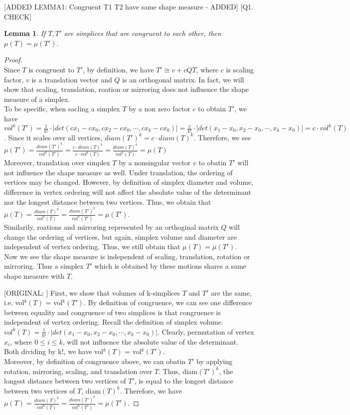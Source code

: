 \documentclass{article}
\newtheorem*{lemma*}{Lemma}
\begin{document}
    [ADDED LEMMA1: Congruent T1 T2 have same shape measure - ADDED]
    [Q1. CHECK]
    \begin{lemma*}
    If $T, T'$ are simplices that are congruent to each other, then $\mu(T) = \mu(T')$.
    \end{lemma*}
    \begin{proof}\mbox{}\\
    Since $T$ is congruent to $T'$, by definition, we have $T' \cong v + cQT$, where $c$ is scaling factor, $v$ is a translation vector and $Q$ is an orthogonal matrix. In fact, we will show that scaling, translation, roation or mirroring does not influence the shape measure of a simplex. \\
    To be specific, when sacling a simplex $T$ by a non zero factor $c$ to obtain $T'$, we have \(vol^k(T') = \displaystyle \frac{1}{k!}\cdot|det(cx_1-cx_0, cx_2-cx_0,\cdots, cx_k-cx_0)| = \frac{c}{k!}\cdot|det(x_1-x_0, x_2-x_0,\cdots, x_k-x_0)| = c\cdot vol^k(T)\). Since it scales over all vertices, $diam(T')^k = c\cdot diam(T)^k$. Therefore, we see $\mu(T') = \frac{diam(T')^k}{vol^k(T')} = \frac{c\cdot diam(T)^k}{c\cdot vol^k(T)} = \frac{diam(T)^k}{vol^k(T)} = \mu(T)$\\
    Moreover, translation over simplex $T$ by a nonsingular vector $v$ to obatin $T'$ will not influence the shape measure as well. Under translation, the ordering of vertices may be changed. However, by definition of simplex diameter and volume, difference in vertex ordering will not affect the absolute value of the determinant nor the longest distance between two vertices. Thus, we obtain that $\mu(T) = \frac{diam(T)^k}{vol^k(T)} = \frac{diam(T')^k}{vol^k(T')} = \mu(T')$.\\
    Similarily, roations and mirroring represented by an orthoginal matrix $Q$ will change the ordering of vertices, but again, simplex volume and diameter are independent of vertex ordering. Thus, we still obtain that $\mu(T)=\mu(T')$.\\
    Now we see the shape measure is independent of scaling, translation, rotation or mirroring. Thus a simplex $T'$ which is obtained by these motions shares a same shape measure with $T$.
    
    [ORIGINAL: ]
    First, we show that volumes of k-simplices $T$ and $T'$ are the same, i.e. vol$^k (T)$ = vol$^k (T')$. By definition of congruence, we can see one difference between equality and congruence of two simplices is that congruence is independent of vertex ordering. Recall the definition of simplex volume. \(vol^k(T) = \displaystyle \frac{1}{k!}\cdot|det(x_1-x_0, x_2-x_0,\cdots, x_k-x_0)|\). Clearly, permutation of vertex $x_i$, where $0 \leq i \leq k$, will not influence the absolute value of the determinant. Both dividing by k!, we have vol$^k (T)$ = vol$^k (T')$.\\
    Moreover, by definition of congruence above, we can obatin $T'$ by applying rotation, mirroring, scaling, and translation over $T$. Thus, diam$(T')^k$, the longest distance between two vertices of $T'$, is equal to the longest distance between two vertices of $T$, diam$(T)^k$. Therefore, we have $\mu(T) = \frac{diam(T)^k}{vol^k(T)} = \frac{diam(T')^k}{vol^k(T')} = \mu(T')$.
    \end{proof}
    
\end{document}
